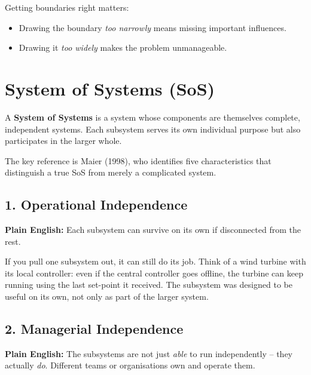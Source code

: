 \vspace{0.5em}
Getting boundaries right matters:
\begin{itemize}[leftmargin=1.5em]
    \item Drawing the boundary \textit{too narrowly} means missing important
    influences.
    \item Drawing it \textit{too widely} makes the problem unmanageable.
\end{itemize}

\section{System of Systems (SoS)}

A \textbf{System of Systems} is a system whose components are themselves
complete, independent systems. Each subsystem serves its own individual purpose
but also participates in the larger whole.

The key reference is Maier (1998), who identifies five characteristics that
distinguish a true SoS from merely a complicated system.

\subsection{1. Operational Independence}

\begin{mdframed}[backgroundcolor=lightgray, linewidth=0pt, innertopmargin=6pt,
innerbottommargin=6pt]
\textbf{Plain English:} Each subsystem can survive on its own if disconnected
from the rest.
\end{mdframed}

If you pull one subsystem out, it can still do its job. Think of a wind turbine
with its local controller: even if the central controller goes offline, the
turbine can keep running using the last set-point it received. The subsystem was
designed to be useful on its own, not only as part of the larger system.

\subsection{2. Managerial Independence}

\begin{mdframed}[backgroundcolor=lightgray, linewidth=0pt, innertopmargin=6pt,
innerbottommargin=6pt]
\textbf{Plain English:} The subsystems are not just \emph{able} to run
independently -- they actually \emph{do}. Different teams or organisations own
and operate them.
\end{mdframed}

